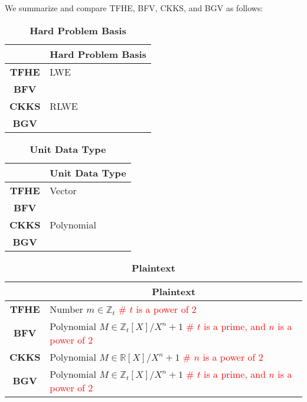 
We summarize and compare TFHE, BFV, CKKS, and BGV as follows:

\begin{comment}
\clearpage



\end{comment}

\captionsetup{justification=raggedright,singlelinecheck=false,labelfont=bf}

\begin{table}[h]
\begin{tabular}{|c||l|}
\hline
&\textbf{Hard Problem Basis}\\\hline\hline
\textbf{TFHE}&LWE\\\hline
\textbf{BFV}&\\
\textbf{CKKS}&RLWE\\
\textbf{BGV}&\\\hline
\end{tabular}
\caption{\textbf{Hard Problem Basis}}
\end{table}

\begin{table}[h]
\begin{tabular}{|c||l|}
\hline
&\textbf{Unit Data Type}\\\hline\hline
\textbf{TFHE}&Vector\\\hline
\textbf{BFV}&\\
\textbf{CKKS}&Polynomial\\
\textbf{BGV}&\\\hline
\end{tabular}
\caption{\textbf{Unit Data Type}}
\end{table}

\begin{table}[h]
\begin{tabular}{|c||l|}
\hline
&\multicolumn{1}{c|}{\textbf{Plaintext}}\\\hline\hline
\textbf{TFHE}&Number $m \in \mathbb{Z}_t$ \text{ } \textcolor{red}{ \# $t$ is a power of 2}\\\hline
\textbf{BFV}&Polynomial $M \in \mathbb{Z}_t[X]/X^n+1$ \text{ } \textcolor{red}{ \# $t$ is a prime, and $n$ is a power of 2}\\\hline
\textbf{CKKS}&Polynomial $M \in \mathbb{R}[X]/X^n+1$ \text{ }\textcolor{red}{ \# $n$ is a power of 2}\\\hline
\textbf{BGV}&Polynomial $M \in \mathbb{Z}_t[X]/X^n+1$ \text{ } \textcolor{red}{ \# $t$ is a prime, and $n$ is a power of 2}\\\hline
\end{tabular}
\caption{\textbf{Plaintext}}
\end{table}

